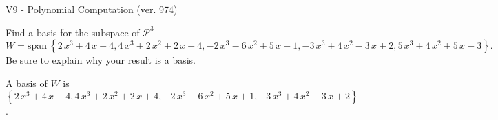\begin{exercise}
  \begin{exerciseTitle}V9 - Polynomial Computation (ver. 974)\end{exerciseTitle}
  \begin{exerciseStatement}
    Find a basis for the subspace of \(\mathcal{P}^3\) 
\[W=\mathrm{span}\ \left\{2 \, x^{3} + 4 \, x - 4 , 4 \, x^{3} + 2 \, x^{2} + 2 \, x + 4 , -2 \, x^{3} - 6 \, x^{2} + 5 \, x + 1 , -3 \, x^{3} + 4 \, x^{2} - 3 \, x + 2 , 5 \, x^{3} + 4 \, x^{2} + 5 \, x - 3\right\}.\]
 Be sure to explain why your result is a basis.


  \end{exerciseStatement}
  \begin{exerciseAnswer}
   A basis of \(W\) is  \(\left\{2 \, x^{3} + 4 \, x - 4 , 4 \, x^{3} + 2 \, x^{2} + 2 \, x + 4 , -2 \, x^{3} - 6 \, x^{2} + 5 \, x + 1 , -3 \, x^{3} + 4 \, x^{2} - 3 \, x + 2\right\}\).
  


  \end{exerciseAnswer}
\end{exercise}